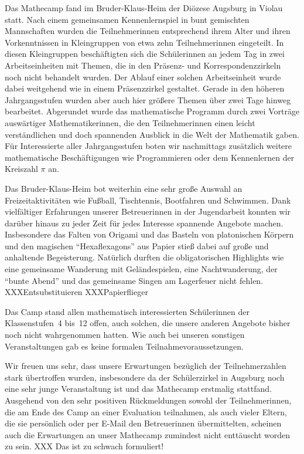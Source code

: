 \documentclass[12pt]{zettel}
\begin{document}
Das Mathecamp fand im Bruder-Klaus-Heim der Diözese Augsburg in Violau statt. Nach einem gemeinsamen Kennenlernspiel in bunt gemischten Mannschaften wurden die Teilnehmerinnen
entsprechend ihrem Alter und ihren Vorkenntnissen in Kleingruppen von etwa zehn Teilnehmerinnen eingeteilt. In diesen Kleingruppen beschäftigten sich die Schülerinnen an jedem Tag
in zwei Arbeitseinheiten mit Themen, die in den Präsenz- und Korrespondenzzirkeln noch nicht behandelt wurden. Der Ablauf einer solchen Arbeitseinheit wurde dabei weitgehend wie in
einem Präsenzzirkel gestaltet. Gerade in den höheren Jahrgangsstufen wurden aber auch hier größere Themen über zwei Tage hinweg bearbeitet. Abgerundet wurde das mathematische
Programm durch zwei Vorträge auswärtiger Mathematikerinnen, die den Teilnehmerinnen einen leicht verständlichen und doch
spannenden Ausblick in die Welt der Mathematik gaben. Für Interessierte aller Jahrgangsstufen boten wir nachmittags zusätzlich weitere mathematische Beschäftigungen wie Programmieren
oder dem Kennenlernen der Kreiszahl $\pi$ an.

Das Bruder-Klaus-Heim bot weiterhin eine sehr große Auswahl an Freizeitaktivitäten wie Fußball, Tischtennis, Bootfahren und Schwimmen. Dank vielfältiger Erfahrungen unserer Betreuerinnen
in der Jugendarbeit konnten wir darüber hinaus zu jeder Zeit für jedes Interesse spannende Angebote machen. Insbesondere das Falten von Origami und das Basteln von platonischen
Körpern und den magischen "`Hexaflexagons"' aus Papier stieß dabei auf große und anhaltende Begeisterung. Natürlich durften die obligatorischen Highlights wie eine gemeinsame
Wanderung mit Geländespielen, eine Nachtwanderung, der "`bunte Abend"' und das gemeinsame Singen am Lagerfeuer nicht fehlen. XXXEntsubstituieren XXXPapierflieger

Das Camp stand allen mathematisch interessierten Schülerinnen der
Klassenstufen~4 bis~12 offen, auch solchen, die unsere anderen Angebote bisher
noch nicht wahrgenommen hatten. Wie auch bei unseren sonstigen Veranstaltungen
gab es keine formalen Teilnahmevoraussetzungen.

Wir freuen uns sehr, dass unsere Erwartungen bezüglich der Teilnehmerzahlen stark übertroffen wurden, insbesondere da der Schülerzirkel in Augsburg noch eine sehr junge
Veranstaltung ist und das Mathecamp erstmalig stattfand. Ausgehend von den sehr positiven Rückmeldungen sowohl der Teilnehmerinnen, die am Ende des Camp an einer Evaluation
teilnahmen, als auch vieler Eltern, die sie persönlich oder per E-Mail den Betreuerinnen übermittelten, scheinen auch die Erwartungen an unser Mathecamp zumindest nicht enttäuscht
worden zu sein. XXX Das ist zu schwach formuliert!
\end{document}
